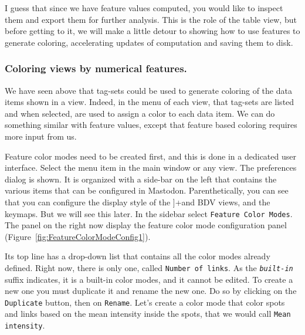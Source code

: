 I guess that since we have feature values computed, you would like to inspect them and export them for further analysis.
This is the role of the table view, but before getting to it, we will make a little detour to showing how to use features to generate coloring, accelerating updates of computation and saving them to disk.


\subsubsection{Coloring views by numerical features.}

We have seen above that tag-sets could be used to generate coloring of the data items shown in a view. 
Indeed, in the  menu of each view, that tag-sets are listed and when selected, are used to assign a color to each data item.
We can do something similar with feature values, except that feature based coloring requires more input from us.

Feature color modes need to be created first, and this is done in a dedicated user interface. 
Select the  menu item in the main window or any view.
The preferences dialog is shown.
It is organized with a side-bar on the left that contains the various items that can be configured in Mastodon. 
Parenthetically, you can see that you can configure the display style of the ]+\TrackScheme and BDV views, and the keymaps. 
But we will see this later.
In the sidebar select \texttt{Feature Color Modes}.
The panel on the right now display the feature color mode configuration panel (Figure~\ref{fig:FeatureColorModeConfig1}).

Its top line has a drop-down list that contains all the color modes already defined. 
Right now, there is only one, called \texttt{Number of links}.
As the \texttt{\textit{built-in}} suffix indicates, it is a built-in color modes, and it cannot be edited. 
To create a new one you must duplicate it and rename the new one.   
Do so by clicking on the \texttt{Duplicate} button, then on \texttt{Rename}.
Let's create a color mode that color spots and links based on the mean intensity inside the spots, that we would call \texttt{Mean intensity}.

